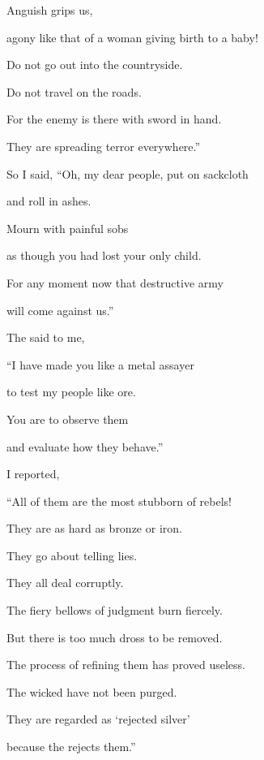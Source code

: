 {\par }{\Q Anguish
grips
us,
\par }{\Q agony
like that of a woman giving birth to a baby!
\par }{\Q {}Do not
go out
into the countryside.
\par }{\Q Do not
travel
on the roads.
\par }{\Q For
the enemy
is there with sword
in hand.

\par }{\Q They are spreading terror
everywhere.”
\par }{\Q {}So I said, “Oh, my dear
people,
put on
sackcloth
\par }{\Q and roll
in ashes.
\par }{\Q Mourn
with painful
sobs
\par }{\Q as though you had lost your only child.
\par }{\Q For any moment now
that
destructive army
\par }{\Q will come
against us.”
\par }{\PP {}The
{} said to me,

\par }{\Q “I have made
you like a metal assayer
\par }{\Q to test
my people
like ore.

\par }{\Q You are to observe
them
\par }{\Q and evaluate
how they behave.”
\par }{\PP {}I reported,
\par }{\Q “All
of them are
the most stubborn of rebels!

\par }{\Q They are
as hard as
bronze
or
iron.
\par }{\Q They go about telling lies.
\par }{\Q They all
deal corruptly.
\par }{\Q {}The fiery
bellows
of judgment burn fiercely.
\par }{\Q But there is too much dross
to be removed.

\par }{\Q The process
of refining
them has proved useless.
\par }{\Q The wicked
have not
been purged.
\par }{\Q {}They are regarded
as ‘rejected
silver’
\par }{\Q because
the {}
rejects them.”

}

